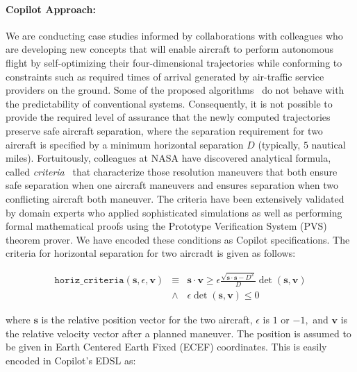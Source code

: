\paragraph{Copilot Approach:} We are conducting case studies informed
by collaborations with colleagues who are developing new concepts that
will enable aircraft to perform autonomous flight by self-optimizing
their four-dimensional trajectories while conforming to constraints
such as required times of arrival generated by air-traffic service
providers on the ground. Some of the proposed
algorithms~\cite{KarrVRC} do not behave with the predictability of
conventional systems.  Consequently, it is not possible to provide the
required level of assurance that the newly computed trajectories
preserve safe aircraft separation, where the separation requirement
for two aircraft is specified by a minimum horizontal separation $D$
(typically, $5$ nautical miles).  Fortuitously, colleagues at NASA
have discovered analytical formula, called
\emph{criteria}~\cite{NM2011NASA,NMH14ATIO} that characterize those
resolution maneuvers that both ensure safe separation when one
aircraft maneuvers and ensures separation when two conflicting
aircraft both maneuver. The criteria have been extensively validated
by domain experts who applied sophisticated simulations as well as
performing formal mathematical proofs using the Prototype Verification
System (PVS) theorem prover. We have encoded these conditions as
Copilot specifications. The criteria for horizontal separation for two
aircradt is given as follows:

\begin{eqnarray*} \texttt{horiz\_criteria}(\bm{s}, \epsilon, \bm{v})
& \equiv &  \bm{s} \cdot \bm{v} \geq \epsilon  \frac{\sqrt{\bm{s} \cdot
  \bm{s}  - D^2}} {D} \operatorname{det}(\bm{s},\bm{v})  \\
& \wedge &  \epsilon \operatorname{det}(\bm{s},\bm{v})  \leq  0 
\end{eqnarray*}

\noindent 
where $\bm{s}$ is the relative position 
vector for the two aircraft, $\epsilon$ is $1$ or $-1,$  and 
$\bm{v}$ is the relative velocity vector after a planned maneuver. 
The position is  assumed to be given in Earth Centered Earth Fixed (ECEF)
coordinates.  This is easily encoded in  Copilot's EDSL as:

